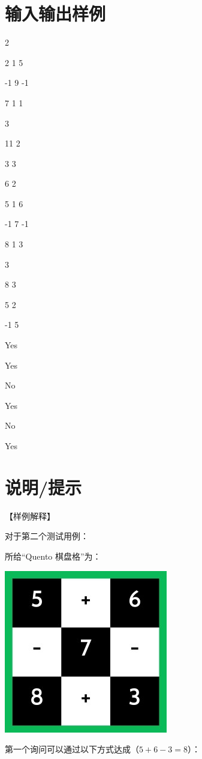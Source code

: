\documentclass{../cpct/ctpro}
\begin{document}
\section*{输入输出样例}
\testcasetab
{
    2\par
    2 1 5\par
    -1 9 -1\par
    7 1 1\par
    3\par
    11 2\par
    3 3\par
    6 2\par
    5 1 6\par
    -1 7 -1\par
    8 1 3\par
    3\par
    8 3\par
    5 2\par
    -1 5
}
{
    Yes\par
    Yes\par
    No\par
    Yes\par
    No\par
    Yes
}

\section*{说明/提示}

【样例解释】

对于第二个测试用例：

所给“Quento 棋盘格”为：

\begin{center}
    \includegraphics{images/quento3.jpg}
\end{center}

第一个询问可以通过以下方式达成（$5+6-3=8$）：
\end{document}
